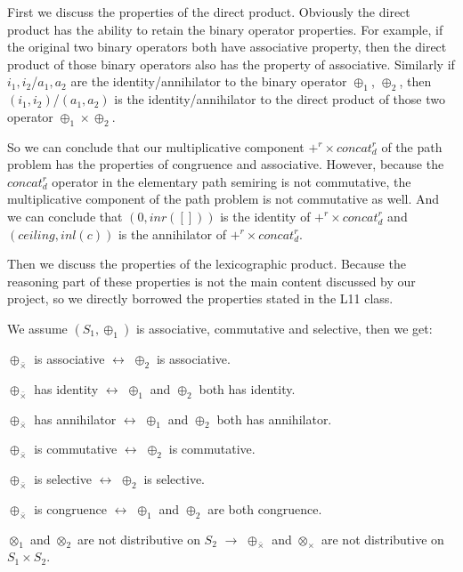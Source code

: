 \documentclass[a4paper,12pt,twoside,openright]{report}
\begin{document}
First we discuss the properties of the direct product. Obviously the direct product has the ability to retain the binary operator properties. For example, if the original two binary operators both have associative property, then the direct product of those binary operators also has the property of associative. Similarly if $i_1,i_2$/$a_1,a_2$ are the identity/annihilator to the binary operator $\oplus_1$, $\oplus_2$, then $(i_1,i_2)$/$(a_1,a_2)$ is the identity/annihilator to the direct product of those two operator $\oplus_1 \times \oplus_2$.

So we can conclude that our multiplicative component $+^r \times concat^r_d$ of the path problem has the properties of congruence and associative. However, because the $concat^r_d$ operator in the elementary path semiring is not commutative, the multiplicative component of the path problem is not commutative as well. And we can conclude that $(0,inr([]))$ is the identity of $+^r \times concat^r_d$ and $(ceiling,inl(c))$ is the annihilator of $+^r \times concat^r_d$.


Then we discuss the properties of the lexicographic product.
Because the reasoning part of these properties is not the main content discussed by our project, so we directly borrowed the properties stated in the L11 class.

We assume $(S_1,\oplus_1)$ is associative, commutative and selective, then we get:

\begin{center}
$\oplus_{\bar{\times}}$ is associative $\longleftrightarrow$ $\oplus_2$ is associative.

$\oplus_{\bar{\times}}$ has identity $\longleftrightarrow$ $\oplus_1$ and $\oplus_2$ both has identity.

$\oplus_{\bar{\times}}$ has annihilator $\longleftrightarrow$ $\oplus_1$ and $\oplus_2$ both has annihilator.

$\oplus_{\bar{\times}}$ is commutative $\longleftrightarrow$ $\oplus_2$ is commutative.

$\oplus_{\bar{\times}}$ is selective $\longleftrightarrow$ $\oplus_2$ is selective.

$\oplus_{\bar{\times}}$ is congruence $\longleftrightarrow$ $\oplus_1$ and $\oplus_2$ are both congruence.

$\otimes_1$ and $\otimes_2$ are not distributive on $S_2$ $\longrightarrow$ $\oplus_{\bar{\times}}$ and  $\otimes_\times$ are not distributive on $S_1 \times S_2$.

\end{center}
\end{document}

